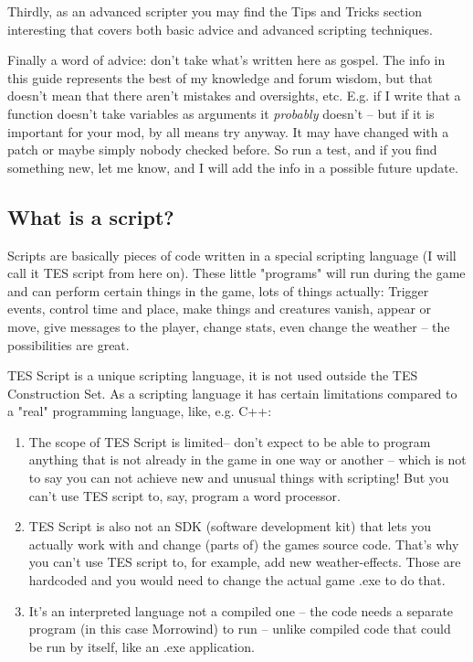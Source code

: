 \documentclass[
]{article}
\begin{document}
Thirdly, as an advanced scripter you may find the Tips and Tricks
section interesting that covers both basic advice and advanced scripting
techniques.

Finally a word of advice: don't take what's written here as gospel. The
info in this guide represents the best of my knowledge and forum wisdom,
but that doesn't mean that there aren't mistakes and oversights, etc.
E.g. if I write that a function doesn't take variables as arguments it
\emph{probably} doesn't -- but if it is important for your mod, by all
means try anyway. It may have changed with a patch or maybe simply
nobody checked before. So run a test, and if you find something new, let
me know, and I will add the info in a possible future update.

\hypertarget{what-is-a-script}{%
\subsection{What is a script?}\label{what-is-a-script}}

Scripts are basically pieces of code written in a special scripting
language (I will call it TES script from here on). These little
"programs" will run during the game and can perform certain things in
the game, lots of things actually: Trigger events, control time and
place, make things and creatures vanish, appear or move, give messages
to the player, change stats, even change the weather -- the
possibilities are great.

TES Script is a unique scripting language, it is not used outside the
TES Construction Set. As a scripting language it has certain limitations
compared to a "real" programming language, like, e.g. C++:

\begin{enumerate}
\def\labelenumi{\arabic{enumi}.}
\item
  The scope of TES Script is limited-- don't expect to be able to
  program anything that is not already in the game in one way or another
  -- which is not to say you can not achieve new and unusual things with
  scripting! But you can't use TES script to, say, program a word
  processor.
\item
  TES Script is also not an SDK (software development kit) that lets you
  actually work with and change (parts of) the games source code. That's
  why you can't use TES script to, for example, add new weather-effects.
  Those are hardcoded and you would need to change the actual game .exe
  to do that.
\item
  It's an interpreted language not a compiled one -- the code needs a
  separate program (in this case Morrowind) to run -- unlike compiled
  code that could be run by itself, like an .exe application.
\end{enumerate}
\end{document}
